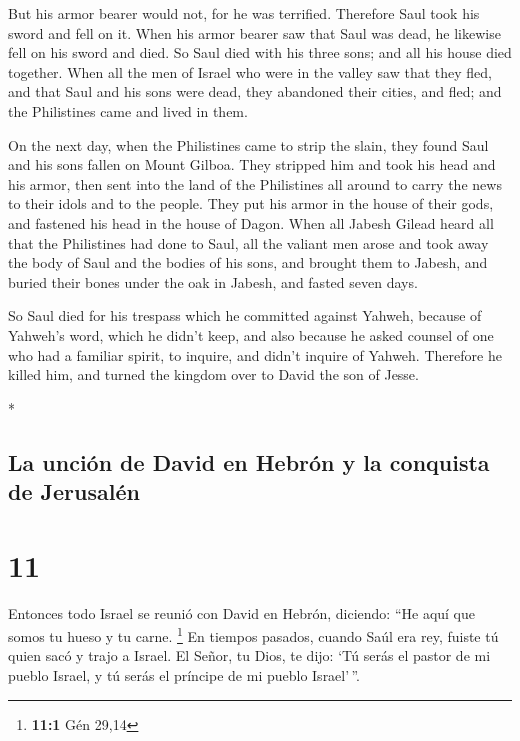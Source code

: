 \begin{paracol}{2}
\begin{otherlanguage}{english}
But his armor bearer would not, for he was terrified. Therefore Saul
took his sword and fell on it.  When his armor bearer saw
that Saul was dead, he likewise fell on his sword and died.
 So Saul died with his three sons; and all his house died
together.  When all the men of Israel who were in the
valley saw that they fled, and that Saul and his sons were dead, they
abandoned their cities, and fled; and the Philistines came and lived in
them.

 On the next day, when the Philistines came to strip the
slain, they found Saul and his sons fallen on Mount Gilboa.
 They stripped him and took his head and his armor, then
sent into the land of the Philistines all around to carry the news to
their idols and to the people.  They put his armor in the
house of their gods, and fastened his head in the house of Dagon.
 When all Jabesh Gilead heard all that the Philistines
had done to Saul,  all the valiant men arose and took
away the body of Saul and the bodies of his sons, and brought them to
Jabesh, and buried their bones under the oak in Jabesh, and fasted seven
days.

 So Saul died for his trespass which he committed against
Yahweh, because of Yahweh's word, which he didn't keep, and also because
he asked counsel of one who had a familiar spirit, to inquire,
 and didn't inquire of Yahweh. Therefore he killed him,
and turned the kingdom over to David the son of Jesse.

\end{otherlanguage}

\switchcolumn[0]*

\hypertarget{la-unciuxf3n-de-david-en-hebruxf3n-y-la-conquista-de-jerusaluxe9n}{%
\subsection{La unción de David en Hebrón y la conquista de
Jerusalén}\label{la-unciuxf3n-de-david-en-hebruxf3n-y-la-conquista-de-jerusaluxe9n}}

\hypertarget{section-20}{%
\section{11}\label{section-20}}

 Entonces todo Israel se reunió con David en Hebrón,
diciendo: ``He aquí que somos tu hueso y tu carne. \footnote{\textbf{11:1}
  Gén 29,14}  En tiempos pasados, cuando Saúl era rey,
fuiste tú quien sacó y trajo a Israel. El Señor, tu Dios, te dijo: `Tú
serás el pastor de mi pueblo Israel, y tú serás el príncipe de mi pueblo
Israel'\,''.


\end{paracol}
